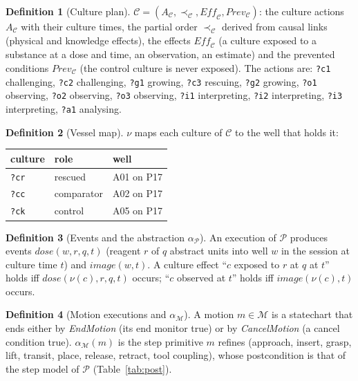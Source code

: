 \documentclass[10pt,a4paper]{article}
\theoremstyle{plain}\newtheorem{theorem}{Theorem}\newtheorem{lemma}{Lemma}\newtheorem{corollary}{Corollary}
\theoremstyle{definition}\newtheorem{definition}{Definition}\newtheorem{assumption}{Assumption}
\theoremstyle{remark}\newtheorem*{remark}{Remark}
\newcommand{\M}{\mathcal{M}}\newcommand{\Pl}{\mathcal{P}}\newcommand{\Lp}{\mathcal{L}}\newcommand{\C}{\mathcal{C}}
\begin{document}
\begin{definition}[Culture plan]\label{def:culture}
$\C = (A_{\C}, \prec_{\C}, \mathit{Eff}_{\C}, \mathit{Prev}_{\C})$: the culture actions $A_{\C}$ with their culture times, the
partial order $\prec_{\C}$ derived from causal links (physical and knowledge effects), the effects $\mathit{Eff}_{\C}$
(a culture exposed to a substance at a dose and time, an observation, an estimate) and the prevented conditions
$\mathit{Prev}_{\C}$ (the control culture is never exposed). The actions are: \texttt{?c1} challenging, \texttt{?c2} challenging, \texttt{?g1} growing, \texttt{?c3} rescuing, \texttt{?g2} growing, \texttt{?o1} observing, \texttt{?o2} observing, \texttt{?o3} observing, \texttt{?i1} interpreting, \texttt{?i2} interpreting, \texttt{?i3} interpreting, \texttt{?a1} analysing.
\end{definition}

\begin{definition}[Vessel map]
$\nu$ maps each culture of $\C$ to the well that holds it:
\begin{center}\small\begin{tabular}{lll}\toprule culture & role & well \\\midrule \texttt{?cr} & rescued & A01 on P17 \\ \texttt{?cc} & comparator & A02 on P17 \\ \texttt{?ck} & control & A05 on P17 \\\bottomrule\end{tabular}\end{center}
\end{definition}

\begin{definition}[Events and the abstraction $\alpha_{\Pl}$]
An execution of $\Pl$ produces events $\mathit{dose}(w, r, q, t)$ (reagent $r$ of $q$ abstract units into well $w$
in the session at culture time $t$) and $\mathit{image}(w, t)$. A culture effect ``$c$ exposed to $r$ at $q$ at $t$''
holds iff $\mathit{dose}(\nu(c), r, q, t)$ occurs; ``$c$ observed at $t$'' holds iff $\mathit{image}(\nu(c), t)$ occurs.
\end{definition}

\begin{definition}[Motion executions and $\alpha_{\M}$]
A motion $m \in \M$ is a statechart that ends either by \emph{EndMotion} (its end monitor true) or by
\emph{CancelMotion} (a cancel condition true). $\alpha_{\M}(m)$ is the step primitive $m$ refines (approach, insert,
grasp, lift, transit, place, release, retract, tool coupling), whose postcondition is that of the step model of
$\Pl$ (Table~\ref{tab:post}).
\end{definition}
\end{document}
